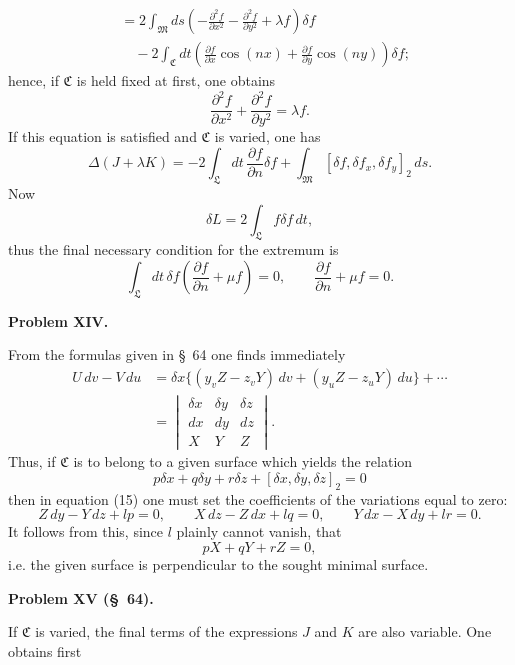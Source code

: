 \documentclass[11pt,a4paper,leqno]{article}
\begin{document}
\[
\begin{aligned}
&=2\int_{\mathfrak{M}}ds
\left(-\frac{\partial^2f}{\partial x^2}
-\frac{\partial^2f}{\partial y^2}+\lambda f\right)\delta f\\
&\quad-2\int_{\mathfrak{C}}dt
\left(\frac{\partial f}{\partial x}\cos(nx)
+\frac{\partial f}{\partial y}\cos(ny)\right)\delta f;
\end{aligned}
\]
hence, if $\mathfrak{C}$ is held fixed at first, one obtains
\[
\frac{\partial^2f}{\partial x^2}+\frac{\partial^2f}{\partial y^2}
=\lambda f.
\]
If this equation is satisfied and $\mathfrak{C}$ is varied, one has
\[
\Delta(J+\lambda K)
=-2\int_{\mathfrak{L}}dt\,\frac{\partial f}{\partial n}\delta f
+\int_{\mathfrak{M}}[\delta f,\delta f_x,\delta f_y]_2\,ds.
\]
Now
\[
\delta L=2\int_{\mathfrak{L}}f\delta f\,dt,
\]
thus the final necessary condition for the extremum is
\[
\int_{\mathfrak{L}}dt\,\delta f
\left(\frac{\partial f}{\partial n}+\mu f\right)=0,\qquad
\frac{\partial f}{\partial n}+\mu f=0.
\]

\begin{center}
\textbf{Problem XIV.}
\end{center}

From the formulas given in \S~64 one finds immediately
\[
\begin{aligned}
U\,dv-V\,du
&=\delta x\{(y_vZ-z_vY)\,dv+(y_uZ-z_uY)\,du\}+\cdots\\
&=\begin{vmatrix}
\delta x&\delta y&\delta z\\
dx&dy&dz\\
X&Y&Z
\end{vmatrix}.
\end{aligned}
\]
Thus, if $\mathfrak{C}$ is to belong to a given surface which yields the
relation
\[
p\delta x+q\delta y+r\delta z+[\delta x,\delta y,\delta z]_2=0
\]
then in equation (15) one must set the coefficients of the variations equal
to zero:
\[
Z\,dy-Y\,dz+lp=0,\qquad X\,dz-Z\,dx+lq=0,\qquad
Y\,dx-X\,dy+lr=0.
\]
It follows from this, since $l$ plainly cannot vanish, that
\[
pX+qY+rZ=0,
\]
i.e. the given surface is perpendicular to the sought minimal surface.

\begin{center}
\textbf{Problem XV (\S~64).}
\end{center}

If $\mathfrak{C}$ is varied, the final terms of the expressions $J$ and $K$
are also variable. One obtains first
\end{document}
